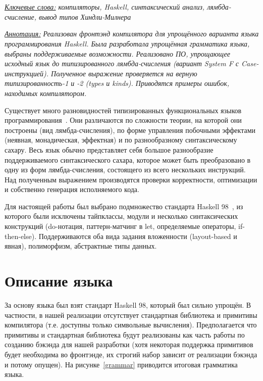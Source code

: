 \documentclass[a4paper,12pt]{article}
\makeatletter
\let\thetitle\@title
\makeatother
\begin{document}
\section*{\thetitle}

\textit{\underline{Ключевые слова:}
  компиляторы, Haskell, синтаксический анализ, лямбда-счисление, вывод типов Хиндли-Милнера
}

\textit{\underline{Аннотация:}
  Реализован фронтэнд компилятора для упрощённого варианта языка
  программирования Haskell. Была разработала упрощённая грамматика языка, выбраны
  поддерживаемые возможности. Реализовано ПО, упрощающее исходный язык до
  типизированного лямбда-счисления (вариант System F с Case-инструкцией). Полученное
  выражение проверяется на верную типизированность-1 и -2 (types и
  kinds). Приводятся примеры ошибок, находимых компилятором.
}

Существует много разновидностей типизированных функциональных языков
программирования~\cite{agda}\cite{idris}\cite{ml}. Они различаются по
сложности теории, на которой они построены (вид лямбда-счисления), по форме
управления побочными эффектами (неявная, монадическая, эффектная) и по
разнообразному синтаксическому сахару. Весь язык обычно представляет себя
большое разнообразие поддерживаемого синтаксического сахара, которое может быть
преобразовано в одну из форм лямбда-счисления, состоящего из всего нескольких
инструкций. Над полученным выражением производятся проверки корректности,
оптимизации и собственно генерация исполняемого кода.

Для настоящей работы был выбрано подмножество стандарта Haskell
98~\cite{haskell98}, из которого были исключены тайпклассы, модули и несколько
синтаксических конструкций (do-нотация, паттерн-матчинг в let, определяемые
операторы, if-then-else). Поддерживаются оба вида задания вложенности
(layout-based и явная), полиморфизм, абстрактные типы данных.

\section{Описание языка}

За основу языка был взят стандарт Haskell 98, который был сильно упрощён. В
частности, в нашей реализации отсутствует стандартная библиотека и примитивы
компилятора (т.е. доступны только символьные вычисления). Предполагается что
примитивы и стандартная библиотека будут реализованы как часть работы по
созданию бэкэнда для нашей разработки (хотя некоторая поддержка примитивов будет
необходима во фронтэнде, их строгий набор зависит от реализации бэкэнда и потому
опущен). На рисунке~\ref{grammar} приводится итоговая грамматика языка.
\end{document}
